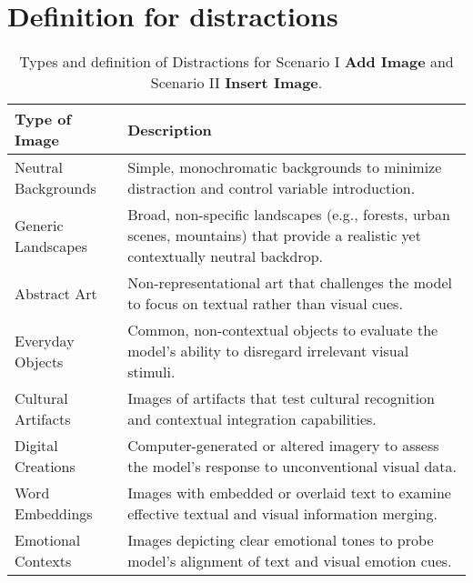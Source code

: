 \section{Definition for distractions}
\label{sec:appendix-definition}

\begin{table*}[H]
\centering
\begin{tabular}{p{3cm}p{9cm}}
\toprule
\textbf{Type of Image} & \textbf{Description} \\
\midrule
Neutral Backgrounds & Simple, monochromatic backgrounds to minimize distraction and control variable introduction. \\
\midrule
Generic Landscapes & Broad, non-specific landscapes (e.g., forests, urban scenes, mountains) that provide a realistic yet contextually neutral backdrop. \\
\midrule
Abstract Art & Non-representational art that challenges the model to focus on textual rather than visual cues. \\
\midrule
Everyday Objects & Common, non-contextual objects to evaluate the model's ability to disregard irrelevant visual stimuli. \\
\midrule
Cultural Artifacts & Images of artifacts that test cultural recognition and contextual integration capabilities. \\
\midrule
Digital Creations & Computer-generated or altered imagery to assess the model's response to unconventional visual data. \\
\midrule
Word Embeddings & Images with embedded or overlaid text to examine effective textual and visual information merging. \\
\midrule
Emotional Contexts & Images depicting clear emotional tones to probe model's alignment of text and visual emotion cues. \\
\bottomrule
\end{tabular}
\caption{Types and definition of Distractions for Scenario I \textbf{Add Image} and Scenario II \textbf{Insert Image}.}
\label{tab:definition add images}
\end{table*}



